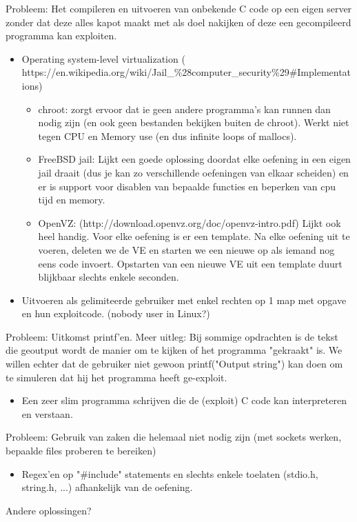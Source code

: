 Probleem: Het compileren en uitvoeren van onbekende C code op een eigen server zonder dat deze alles kapot maakt met als doel nakijken of deze een gecompileerd programma kan exploiten.
\begin{itemize}
\item Operating system-level virtualization (\\https://en.wikipedia.org/wiki/Jail\_\%28computer\_security\%29\#Implementations)
	\begin{itemize}
	\item chroot: zorgt ervoor dat ie geen andere programma's kan runnen dan nodig zijn (en ook geen bestanden bekijken buiten de chroot). Werkt niet tegen CPU en Memory use (en dus infinite loops of mallocs).
	\item FreeBSD jail: Lijkt een goede oplossing doordat elke oefening in een eigen jail draait (dus je kan zo verschillende oefeningen van elkaar scheiden) en er is support voor disablen van bepaalde functies en beperken van cpu tijd en memory.
	\item OpenVZ: (http://download.openvz.org/doc/openvz-intro.pdf) Lijkt ook heel handig. Voor elke oefening is er een template. Na elke oefening uit te voeren, deleten we de VE en starten we een nieuwe op als iemand nog eens code invoert. Opstarten van een nieuwe VE uit een template duurt blijkbaar slechts enkele seconden.
	\end{itemize}
\item Uitvoeren als gelimiteerde gebruiker met enkel rechten op 1 map met opgave en hun exploitcode. (nobody user in Linux?)
\end{itemize}
        
Probleem: Uitkomst printf'en. Meer uitleg: Bij sommige opdrachten is de tekst die geoutput wordt de manier om te kijken of het programma "gekraakt" is. We willen echter dat de gebruiker niet gewoon printf("Output string") kan doen om te simuleren dat hij het programma heeft ge-exploit.

\begin{itemize}
\item Een zeer slim programma schrijven die de (exploit) C code kan interpreteren en verstaan.
\end{itemize}
    
Probleem: Gebruik van zaken die helemaal niet nodig zijn (met sockets werken, bepaalde files proberen te bereiken)

\begin{itemize}
\item Regex'en op "\#include" statements en slechts enkele toelaten (stdio.h, string.h, ...) afhankelijk van de oefening. 
\end{itemize}
Andere oplossingen?


